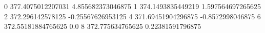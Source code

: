 0 377.4075012207031 4.855682373046875
1 374.1493835449219 1.597564697265625
2 372.296142578125 -0.25567626953125
4 371.69451904296875 -0.8572998046875
6 372.55181884765625 0.0
8 372.775634765625 0.22381591796875
